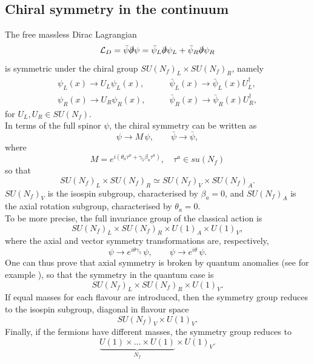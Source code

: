 \subsection{Chiral symmetry in the continuum}

The free massless Dirac Lagrangian
\begin{equation} 
    \mathcal{L}_D = \bar\psi \slashed{\partial} \psi = \bar\psi_L \slashed{\partial} \psi_L + \bar\psi_R \slashed{\partial} \psi_R
\end{equation} 
is symmetric under the chiral group $SU(N_f) _L\times SU(N_f)_R$, namely
\begin{equation*}
	\begin{aligned}
		\psi_L(x) \to U_L\psi_L(x), &\qquad \bar\psi_L(x) \to \bar\psi_L(x) U_L^{\dagger}, \\
		\psi_R(x) \to U_R\psi_R(x), &\qquad \bar\psi_R(x) \to \bar\psi_R(x) U_R^{\dagger},
	\end{aligned}
\end{equation*}
for $U_L, U_R \in SU(N_f)$. \\
In terms of the full spinor $\psi$, the chiral symmetry can be written as 
\begin{equation*} 
    \psi \to M \, \psi, \qquad \bar\psi \to \bar\psi,
\end{equation*} 
where
\begin{equation*}
    M = e^{i(\theta_a \tau^a + \gamma_5 \beta_a\tau^a)}, \quad \tau^a \in su(N_f)
\end{equation*}
so that 
\begin{equation*} 
    SU(N_f) _L\times SU(N_f)_R \simeq SU(N_f)_V \times SU(N_f)_A.
\end{equation*}
$SU(N_f)_V$ is the isospin subgroup, characterised by $\beta_a =0$, and $SU(N_f)_A$ is the axial rotation subgroup, characterised by $\theta_a = 0$. \\
To be more precise, the full invariance group of the classical action is
\begin{equation*}
    SU(N_f)_L \times SU(N_f)_R \times U(1)_A \times U(1)_V,
\end{equation*}
where the axial and vector symmetry transformations are, respectively,
\begin{equation*}
        \psi \to e^{i\theta \gamma_5} \, \psi, \qquad \psi \to e^{i\theta} \, \psi.
\end{equation*} 
One can thus prove that axial symmetry is broken by quantum anomalies (see for example \cite{schwartz}), so that the symmetry in the quantum case is
\begin{equation*}
    SU(N_f)_L \times SU(N_f)_R \times U(1)_V.
\end{equation*}
If equal masses for each flavour are introduced, then the symmetry group reduces to the isospin subgroup, diagonal in flavour space
\begin{equation*}
    SU(N_f)_V \times U(1)_V.
\end{equation*}
Finally, if the fermions have different masses, the symmetry group reduces to 
\begin{equation*}
    \underbrace{U(1) \times \dots \times U(1)}_{N_f} \times U(1)_V.
\end{equation*}

